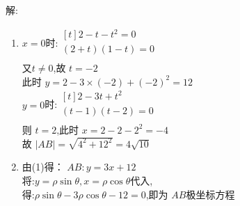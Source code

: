 \documentclass[class=ctexart,crop=false]{standalone}
\begin{document}
解:
\begin{enumerate}[label=(\arabic*)]
    \item 
    $x=0$时:$\begin{aligned}[t]
        2-t-t^2=0\\
        (2+t)(1-t)=0\\
    \end{aligned}$\\
    又$t\neq 0$,故 $t=-2$\\
    此时 $y=2-3\times(-2)+(-2)^2=12$\\
    $y=0$时:$\begin{aligned}[t]
        2-3t+t^2\\
        (t-1)(t-2)=0\\
    \end{aligned}$\\
    则 $t=2$,此时 $x=2-2-2^2=-4$\\
    故 $|AB|=\sqrt{4^2+12^2}=4\sqrt{10}$
    \item 由(1)得： $AB:y=3x+12$\\
        将:$y=\rho \sin \theta,x=\rho \cos \theta$代入,\\
        得:$\rho \sin \theta-3\rho \cos \theta -12=0$,即为 $AB$极坐标方程
\end{enumerate}
\end{document}
